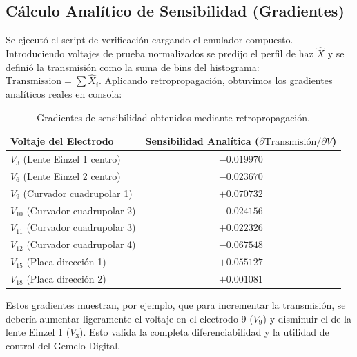 \documentclass[12pt,letterpaper]{article}
\begin{document}
\subsection{Cálculo Analítico de Sensibilidad (Gradientes)}
Se ejecutó el script de verificación cargando el emulador compuesto. Introduciendo voltajes de prueba normalizados se predijo el perfil de haz $\hat{X}$ y se definió la transmisión como la suma de bins del histograma: $\text{Transmission} = \sum \hat{X}_i$. Aplicando retropropagación, obtuvimos los gradientes analíticos reales en consola:
\begin{table}[h]
    \centering
    \caption{Gradientes de sensibilidad obtenidos mediante retropropagación.}
    \begin{tabular}{lc}
        \toprule
        \textbf{Voltaje del Electrodo} & \textbf{Sensibilidad Analítica ($\partial \text{Transmisión} / \partial V$)} \\
        \midrule
        $V_3$ (Lente Einzel 1 centro) & $-0.019970$ \\
        $V_6$ (Lente Einzel 2 centro) & $-0.023670$ \\
        $V_9$ (Curvador cuadrupolar 1) & $+0.070732$ \\
        $V_{10}$ (Curvador cuadrupolar 2) & $-0.024156$ \\
        $V_{11}$ (Curvador cuadrupolar 3) & $+0.022326$ \\
        $V_{12}$ (Curvador cuadrupolar 4) & $-0.067548$ \\
        $V_{15}$ (Placa dirección 1) & $+0.055127$ \\
        $V_{18}$ (Placa dirección 2) & $+0.001081$ \\
        \bottomrule
    \end{tabular}
\end{table}

Estos gradientes muestran, por ejemplo, que para incrementar la transmisión, se debería aumentar ligeramente el voltaje en el electrodo 9 ($V_9$) y disminuir el de la lente Einzel 1 ($V_3$). Esto valida la completa diferenciabilidad y la utilidad de control del Gemelo Digital.
\end{document}
